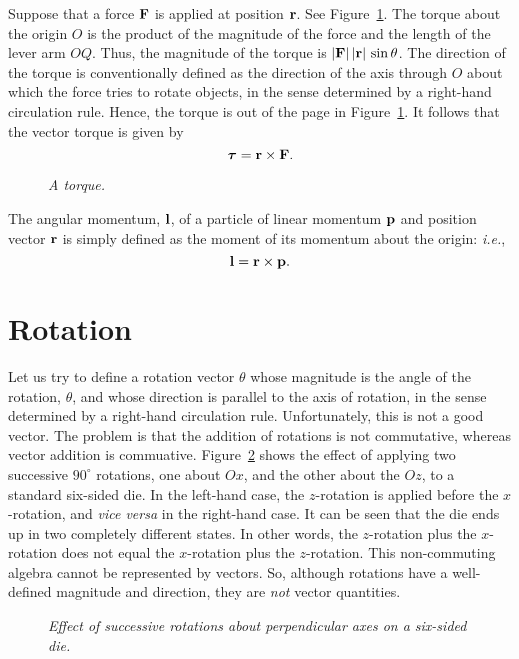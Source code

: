 Suppose that a force ${\bf F}$ is applied at position ${\bf r}$. See Figure~\ref{f8}.
The torque about the origin $O$ is the product of the magnitude of the force and
the length of the lever arm $OQ$. Thus, the magnitude of the torque is
$|{\bf F}|\,|{\bf r}|\,\sin\theta$. The direction of the torque is conventionally defined as the direction of
the axis through $O$ about which the force tries to rotate objects, in the sense
determined by a right-hand circulation rule. Hence, the torque is out of the page in Figure~\ref{f8}.
 It follows that the vector torque is
given by
\begin{equation}\label{etorque}
\mbox{\boldmath$\tau$} = {\bf r}\times{\bf F}.
\end{equation}

\begin{figure}
\epsfysize=2.25in
\centerline{}
\caption{\em A torque.}\label{f8}
\end{figure}

The angular momentum, ${\bf l}$, of a particle of linear momentum ${\bf p}$ and position vector ${\bf r}$ is simply defined as the moment of its
momentum about the origin: {\em i.e.}, 
\begin{equation}
{\bf l}={\bf r}\times {\bf p}.
\end{equation}

\section{Rotation}\label{srotn}
Let us try to define a rotation vector \mbox{\boldmath$\theta$} whose magnitude
is the angle of the rotation, $\theta$, and whose direction is parallel to the axis of 
rotation, in the sense determined by a right-hand circulation rule. Unfortunately, this is not a good vector. The problem is that the addition of rotations
is not commutative, whereas vector addition is commuative. 
Figure~\ref{f9} shows the effect of applying two successive $90^\circ$ rotations,
one about $Ox$, and the other about the $Oz$, to a standard six-sided die. In the
left-hand case, the $z$-rotation is applied before the $x$-rotation, and {\em vice
versa} in the right-hand case. It can be seen that the die ends up in two completely
different states. In other words, the $z$-rotation plus the
$x$-rotation does not equal
the  $x$-rotation plus the $z$-rotation. This non-commuting algebra cannot be
represented by vectors. So, although rotations have a well-defined magnitude and
direction, they are {\em not}\/ vector quantities. 
\begin{figure}
\epsfysize=3in
\centerline{}
\caption{\em Effect of successive rotations about perpendicular axes on a six-sided die.}\label{f9}
\end{figure}

